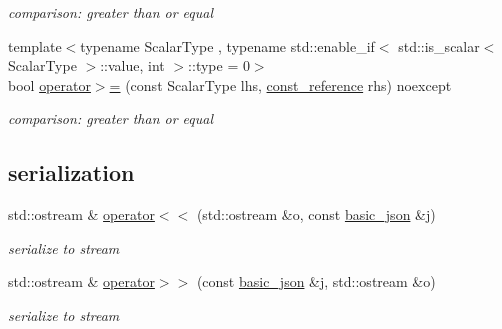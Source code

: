 \begin{DoxyCompactItemize}
\begin{DoxyCompactList}\small\item\em comparison\+: greater than or equal \end{DoxyCompactList}\item 
{\footnotesize template$<$typename Scalar\+Type , typename std\+::enable\+\_\+if$<$ std\+::is\+\_\+scalar$<$ Scalar\+Type $>$\+::value, int $>$\+::type  = 0$>$ }\\bool \hyperlink{classnlohmann_1_1basic__json_a5ee0e3e8afc7cbd932d6ed66418fa80a}{operator$>$=} (const Scalar\+Type lhs, \hyperlink{classnlohmann_1_1basic__json_ab8a1c33ee7b154fc41ca2545aa9724e6}{const\+\_\+reference} rhs) noexcept
\begin{DoxyCompactList}\small\item\em comparison\+: greater than or equal \end{DoxyCompactList}\end{DoxyCompactItemize}
\subsection*{serialization}
\begin{DoxyCompactItemize}
\item 
std\+::ostream \& \hyperlink{classnlohmann_1_1basic__json_a5e34c5435e557d0bf666bd7311211405}{operator$<$$<$} (std\+::ostream \&o, const \hyperlink{classnlohmann_1_1basic__json}{basic\+\_\+json} \&j)
\begin{DoxyCompactList}\small\item\em serialize to stream \end{DoxyCompactList}\item 
std\+::ostream \& \hyperlink{classnlohmann_1_1basic__json_a34d6a60dd99e9f33b8273a1c8db5669b}{operator$>$$>$} (const \hyperlink{classnlohmann_1_1basic__json}{basic\+\_\+json} \&j, std\+::ostream \&o)
\begin{DoxyCompactList}\small\item\em serialize to stream \end{DoxyCompactList}\end{DoxyCompactItemize}
